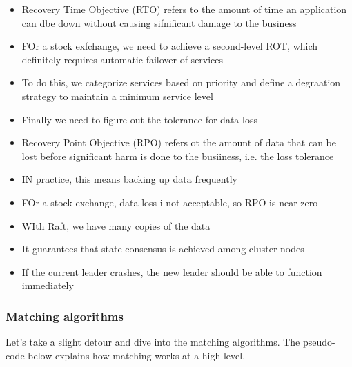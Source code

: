 \documentclass{report}
\theoremstyle{definition}
\let\oldsubsubsection\subsubsection
\renewcommand{\subsubsection}{\oldsubsubsection*}
\begin{document}
\begin{itemize}
\item
Recovery Time Objective (RTO) refers to the amount of time an application can dbe down without causing sifnificant damage to the business
\item
FOr a stock exfchange, we need to achieve a second-level  ROT, which definitely requires automatic failover of services
\item
To do this, we categorize services based on priority and define a degraation strategy to maintain a minimum service level
\item
Finally we need to figure out the tolerance for data loss
\item
Recovery Point Objective (RPO) refers ot the amount of data that can be lost before significant harm is done to the busiiness, i.e. the loss tolerance
\item
IN practice, this means backing up data frequently
\item
FOr a stock exchange, data loss i not acceptable, so RPO is near zero
\item
WIth Raft, we have many copies of the data
\item
It guarantees that state consensus is achieved among cluster nodes
\item
If the current leader crashes, the new leader should be able to function immediately
\end{itemize}

\subsubsection{Matching algorithms}

Let's take a slight detour and dive into the matching algorithms. The pseudo-code below explains how matching works at a high level.
\end{document}
